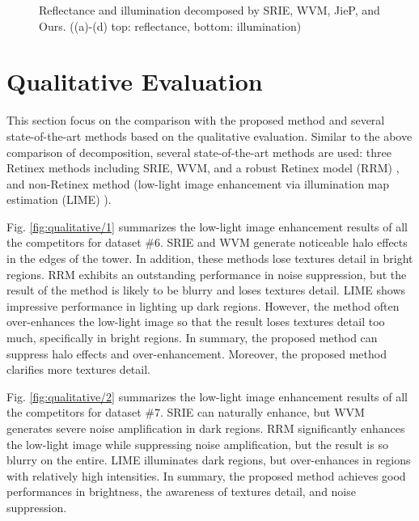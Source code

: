 \begin{figure}[htbp]
\begin{minipage}[b]{0.49\hsize}
	 \label{fig. decomp_prop}
	\end{minipage}
	\caption{Reflectance and illumination decomposed by SRIE, WVM, JieP, and Ours. ((a)-(d) top: reflectance, bottom: illumination)}
	\label{fig:decomposition}
\end{figure}

\section{Qualitative Evaluation} \label{sec:qualitative}
This section focus on the comparison with the proposed method and several state-of-the-art methods based on the qualitative evaluation. 
Similar to the above comparison of decomposition, several state-of-the-art methods are used: three Retinex methods including SRIE, WVM, and a robust Retinex model (RRM) \cite{rrm}, and non-Retinex method (low-light image enhancement via illumination map estimation (LIME) \cite{lime}). \par
Fig. \ref{fig:qualitative/1} summarizes the low-light image enhancement results of all the competitors for dataset $\#6$. SRIE and WVM generate noticeable halo effects in the edges of the tower. In addition, these methods lose textures detail in bright regions. RRM exhibits an outstanding performance in noise suppression, but the result of the method is likely to be blurry and loses textures detail. LIME shows impressive performance in lighting up dark regions. However, the method often over-enhances the low-light image so that the result loses textures detail too much, specifically in bright regions. In summary, the proposed method can suppress halo effects and over-enhancement. Moreover, the proposed method clarifies more textures detail.\par
Fig. \ref{fig:qualitative/2} summarizes the low-light image enhancement results of all the competitors for dataset $\#7$. SRIE can naturally enhance, but WVM generates severe noise amplification in dark regions. RRM significantly enhances the low-light image while suppressing noise amplification, but the result is so blurry on the entire. LIME illuminates dark regions, but over-enhances in regions with relatively high intensities. In summary, the proposed method achieves good performances in brightness, the awareness of textures detail, and noise suppression.
